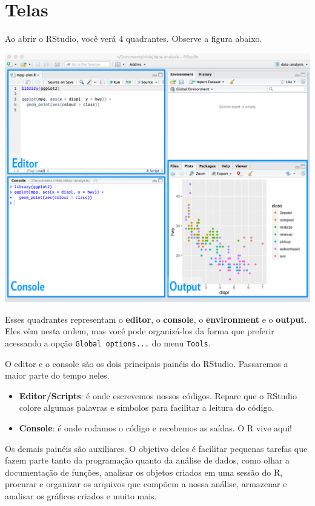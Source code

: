 \documentclass[]{book}
\providecommand{\tightlist}{%
  \setlength{\itemsep}{0pt}\setlength{\parskip}{0pt}}
\begin{document}
\hypertarget{telas}{%
\section{Telas}\label{telas}}

Ao abrir o RStudio, você verá 4 quadrantes. Observe a figura abaixo.

\begin{center}\includegraphics[width=56.24in]{img/rstudio/rstudio-editor} \end{center}

Esses quadrantes representam o \textbf{editor}, o \textbf{console}, o \textbf{environment} e o \textbf{output}. Eles vêm nesta ordem, mas você pode organizá-los da forma que preferir acessando a opção \texttt{Global\ options...} do menu \texttt{Tools}.

O editor e o console são os dois principais painéis do RStudio. Passaremos a maior parte do tempo neles.

\begin{itemize}
\tightlist
\item
  \textbf{Editor/Scripts}: é onde escrevemos nossos códigos. Repare que o RStudio colore algumas palavras e símbolos para facilitar a leitura do código.
\item
  \textbf{Console}: é onde rodamos o código e recebemos as saídas. O R vive aqui!
\end{itemize}

Os demais painéis são auxiliares. O objetivo deles é facilitar pequenas tarefas que fazem parte tanto da programação quanto da análise de dados, como olhar a documentação de funções, analisar os objetos criados em uma sessão do R, procurar e organizar os arquivos que compõem a nossa análise, armazenar e analisar os gráficos criados e muito mais.
\end{document}
